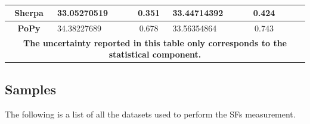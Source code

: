\begin{table}[h!]
\begin{tabular}{|ccccccc|}
		\multicolumn{1}{|c|}{\textbf{Sherpa}} & \multicolumn{1}{l|}{33.05270519}   & \multicolumn{1}{c|}{0.351}   & \multicolumn{1}{l|}{33.44714392} & \multicolumn{1}{c|}{0.424}   & \multicolumn{1}{l|}{}                & \multicolumn{1}{l|}{}          \\ \hline
		\multicolumn{1}{|c|}{\textbf{PoPy}}   & \multicolumn{1}{l|}{34.38227689}   & \multicolumn{1}{c|}{0.678}   & \multicolumn{1}{l|}{33.56354864} & \multicolumn{1}{c|}{0.743}   & \multicolumn{1}{l|}{}                & \multicolumn{1}{l|}{}          \\ \hline
		\multicolumn{7}{|c|}{\textbf{The uncertainty reported in this table only corresponds to the statistical component.}}                                                                                                                                \\ \hline
	\end{tabular}
	\caption{}
	\label{ratio_table}
\end{table}
\subsection{Samples}\label{SampleFiles}
The following is a list of all the datasets used to perform the SFs measurement.


